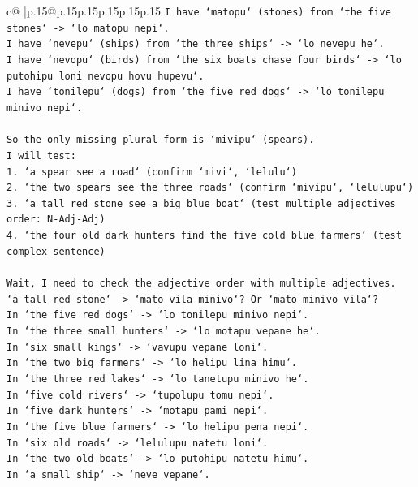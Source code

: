 \documentclass{article}
\begin{document}
{\begin{supertabular}{c@{$\;$}|p{.15\linewidth}@{}p{.15\linewidth}p{.15\linewidth}p{.15\linewidth}p{.15\linewidth}p{.15\linewidth}}
{{{\texttt{I have `matopu` (stones) from `the five stones` {-}> `lo matopu nepi`.} \\
\texttt{I have `nevepu` (ships) from `the three ships` {-}> `lo nevepu he`.} \\
\texttt{I have `nevopu` (birds) from `the six boats chase four birds` {-}> `lo putohipu loni nevopu hovu hupevu`.} \\
\texttt{I have `tonilepu` (dogs) from `the five red dogs` {-}> `lo tonilepu minivo nepi`.} \\
\\ 
\texttt{So the only missing plural form is `mivipu` (spears).} \\
\texttt{I will test:} \\
\texttt{1. `a spear see a road` (confirm `mivi`, `lelulu`)} \\
\texttt{2. `the two spears see the three roads` (confirm `mivipu`, `lelulupu`)} \\
\texttt{3. `a tall red stone see a big blue boat` (test multiple adjectives order: N{-}Adj{-}Adj)} \\
\texttt{4. `the four old dark hunters find the five cold blue farmers` (test complex sentence)} \\
\\ 
\texttt{Wait, I need to check the adjective order with multiple adjectives.} \\
\texttt{`a tall red stone` {-}> `mato vila minivo`? Or `mato minivo vila`?} \\
\texttt{In `the five red dogs` {-}> `lo tonilepu minivo nepi`.} \\
\texttt{In `the three small hunters` {-}> `lo motapu vepane he`.} \\
\texttt{In `six small kings` {-}> `vavupu vepane loni`.} \\
\texttt{In `the two big farmers` {-}> `lo helipu lina himu`.} \\
\texttt{In `the three red lakes` {-}> `lo tanetupu minivo he`.} \\
\texttt{In `five cold rivers` {-}> `tupolupu tomu nepi`.} \\
\texttt{In `five dark hunters` {-}> `motapu pami nepi`.} \\
\texttt{In `the five blue farmers` {-}> `lo helipu pena nepi`.} \\
\texttt{In `six old roads` {-}> `lelulupu natetu loni`.} \\
\texttt{In `the two old boats` {-}> `lo putohipu natetu himu`.} \\
\texttt{In `a small ship` {-}> `neve vepane`.} \\
}}}
\end{supertabular}}
\end{document}
